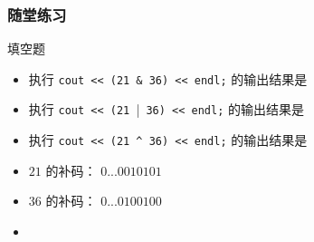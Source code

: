\begin{frame}[fragile]
    \frametitle{随堂练习}

    \begin{exampleblock}{填空题}
        
        \begin{itemize}
            \item 执行 \lstinline|cout << (21 & 36) << endl;| 的输出结果是 
            \item 执行 \lstinline|cout << (21 ||\lstinline| 36) << endl;| 的输出结果是 
            \item 执行 \lstinline|cout << (21 ^ 36) << endl;| 的输出结果是 
            \item $21$ 的补码： $0 ... 0 0 1 0 1 0 1$
            \item $36$ 的补码： $0 ... 0 1 0 0 1 0 0$
            \item \textcolor{red}{
                    \hspace{.1pt}
                }
        \end{itemize}

    \end{exampleblock}

\end{frame}

